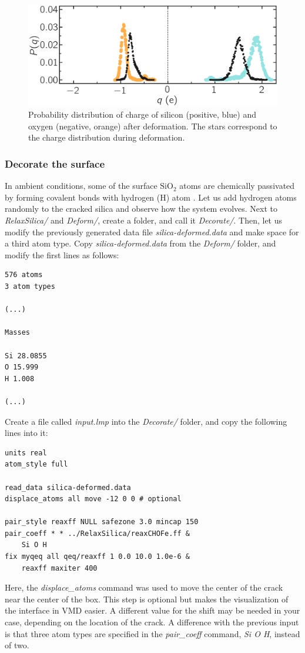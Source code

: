\documentclass[9pt,tutorial]{livecoms}
\begin{document}
\begin{figure}
\includegraphics[width=\linewidth]{SIO-distribution-bis}
\caption{Probability distribution of charge of silicon (positive, blue) and oxygen
(negative, orange) after deformation. The stars correspond to the charge distribution
during deformation.}
\label{fig:SIO-distribution-bis}
\end{figure}

\subsubsection{Decorate the surface}
In ambient conditions, some of the surface $\text{SiO}_2$ atoms are chemically
passivated by forming covalent bonds with hydrogen (H) atom \cite{sulpizi2012silica}.
Let us add hydrogen atoms randomly to the cracked silica and observe how the
system evolves.  Next to \textit{RelaxSilica/} and \textit{Deform/}, create a folder,
and call it \textit{Decorate/}. Then, let us modify the previously generated data
file \textit{silica-deformed.data} and make space for a third atom type.
Copy \textit{silica-deformed.data} from the \textit{Deform/} folder, and modify
the first lines as follows:
{\normalsize \begin{verbatim}
576 atoms
3 atom types

(...)

Masses

Si 28.0855
O 15.999
H 1.008

(...)
\end{verbatim}}
Create a file called \textit{input.lmp} into the \textit{Decorate/} folder, and
copy the following lines into it:
{\normalsize \begin{verbatim}
units real
atom_style full

read_data silica-deformed.data
displace_atoms all move -12 0 0 # optional

pair_style reaxff NULL safezone 3.0 mincap 150
pair_coeff * * ../RelaxSilica/reaxCHOFe.ff &
    Si O H
fix myqeq all qeq/reaxff 1 0.0 10.0 1.0e-6 &
    reaxff maxiter 400
\end{verbatim}}
Here, the \textit{displace\_atoms} command was used to move the center of the
crack near the center of the box. This step is optional but makes the visualization
of the interface in VMD easier. A different value for the shift may be needed in
your case, depending on the location of the crack. A difference with the previous
input is that three atom types are specified in the \textit{pair\_coeff} command,
\textit{Si O H}, instead of two.
\end{document}
